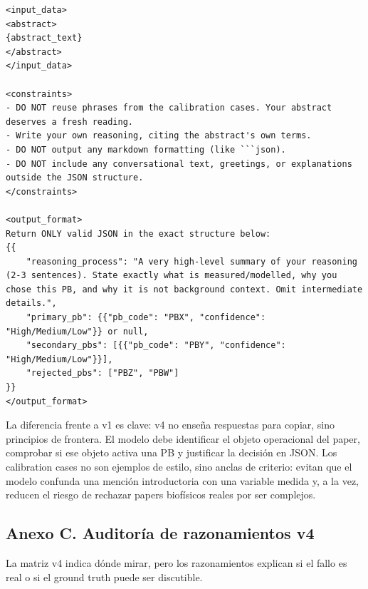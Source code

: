 {\begin{verbatim}
<input_data>
<abstract>
{abstract_text}
</abstract>
</input_data>

<constraints>
- DO NOT reuse phrases from the calibration cases. Your abstract deserves a fresh reading.
- Write your own reasoning, citing the abstract's own terms.
- DO NOT output any markdown formatting (like ```json).
- DO NOT include any conversational text, greetings, or explanations outside the JSON structure.
</constraints>

<output_format>
Return ONLY valid JSON in the exact structure below:
{{
    "reasoning_process": "A very high-level summary of your reasoning (2-3 sentences). State exactly what is measured/modelled, why you chose this PB, and why it is not background context. Omit intermediate details.",
    "primary_pb": {{"pb_code": "PBX", "confidence": "High/Medium/Low"}} or null,
    "secondary_pbs": [{{"pb_code": "PBY", "confidence": "High/Medium/Low"}}],
    "rejected_pbs": ["PBZ", "PBW"]
}}
</output_format>
\end{verbatim}
}

La diferencia frente a v1 es clave: v4 no enseña respuestas para copiar, sino principios de frontera. El modelo debe identificar el objeto operacional del paper, comprobar si ese objeto activa una PB y justificar la decisión en JSON. Los calibration cases no son ejemplos de estilo, sino anclas de criterio: evitan que el modelo confunda una mención introductoria con una variable medida y, a la vez, reducen el riesgo de rechazar papers biofísicos reales por ser complejos.

\subsection*{Anexo C. Auditoría de razonamientos v4}

La matriz v4 indica dónde mirar, pero los razonamientos explican si el fallo es real o si el ground truth puede ser discutible.

